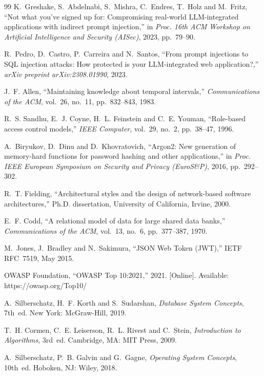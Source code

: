 \begin{thebibliography}{99}
K.~Greshake, S.~Abdelnabi, S.~Mishra, C.~Endres, T.~Holz and M.~Fritz, ``Not what you've signed up
for: Compromising real-world LLM-integrated applications with indirect prompt injection,'' in
\emph{Proc. 16th ACM Workshop on Artificial Intelligence and Security (AISec)}, 2023, pp.~79--90.

R.~Pedro, D.~Castro, P.~Carreira and N.~Santos, ``From prompt injections to SQL injection attacks:
How protected is your LLM-integrated web application?,'' \emph{arXiv preprint arXiv:2308.01990}, 2023.

J.~F. Allen, ``Maintaining knowledge about temporal intervals,'' \emph{Communications of the ACM},
vol.~26, no.~11, pp.~832--843, 1983.

R.~S. Sandhu, E.~J. Coyne, H.~L. Feinstein and C.~E. Youman, ``Role-based access control models,''
\emph{IEEE Computer}, vol.~29, no.~2, pp.~38--47, 1996.

A.~Biryukov, D.~Dinu and D.~Khovratovich, ``Argon2: New generation of memory-hard functions for
password hashing and other applications,'' in \emph{Proc. IEEE European Symposium on Security and
Privacy (EuroS\&P)}, 2016, pp.~292--302.

R.~T. Fielding, ``Architectural styles and the design of network-based software architectures,''
Ph.D. dissertation, University of California, Irvine, 2000.

E.~F. Codd, ``A relational model of data for large shared data banks,'' \emph{Communications of the
ACM}, vol.~13, no.~6, pp.~377--387, 1970.

M.~Jones, J.~Bradley and N.~Sakimura, ``JSON Web Token (JWT),'' IETF RFC~7519, May 2015.

OWASP Foundation, ``OWASP Top 10:2021,'' 2021. [Online]. Available: https://owasp.org/Top10/

A.~Silberschatz, H.~F. Korth and S.~Sudarshan, \emph{Database System Concepts}, 7th~ed.
New York: McGraw-Hill, 2019.

T.~H. Cormen, C.~E. Leiserson, R.~L. Rivest and C.~Stein, \emph{Introduction to Algorithms},
3rd~ed. Cambridge, MA: MIT Press, 2009.

A.~Silberschatz, P.~B. Galvin and G.~Gagne, \emph{Operating System Concepts}, 10th~ed.
Hoboken, NJ: Wiley, 2018.


\end{thebibliography}

